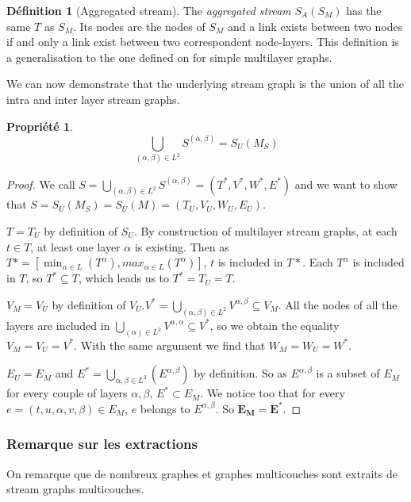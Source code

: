 \documentclass[11pt,a4paper]{article}
\newtheorem{prop}{Propriété}
\theoremstyle{definition}
\newtheorem{defn}{Définition}
\theoremstyle{remark}
\theoremstyle{remark}
\begin{document}
	\begin{defn}[Aggregated stream]
		
		The {\em aggregated stream} $S_A(S_M)$ has the same $T$ as $S_M$. Its nodes are the nodes of $S_M$ and a link exists between two nodes if and only a link exist between two correspondent node-layers.	This definition is a generalisation to the one defined on \cite{mldd} for simple multilayer graphs.
	
	\end{defn}
	
	We can now demonstrate that the underlying stream graph is the union of all the intra and inter layer stream graphs.
	
	\begin{prop}
		\[
			\bigcup_{(\alpha,\beta) \in L^2} S^{(\alpha,\beta)} = S_U(M_S)
		\]
	\end{prop}
	\begin{proof}
	We call $S=\bigcup_{(\alpha,\beta) \in L^2} S^{(\alpha,\beta)}=(T^{*},V^{*},W^{*},E^{*})$ and we want to show that $S=S_U(M_S)=S_U(M) = (T_U,V_U,W_U,E_U)$.
	
	$T=T_U$ by definition of $S_U$. By construction of multilayer stream graphs, at each $t\in T$, at least one layer $\alpha$ is existing. Then as $T* = [\min_{\alpha \in L} (T^{\alpha}),max_{\alpha \in L} (T^{\alpha})]$, $t$ is included in $T*$. Each $T^{\alpha}$ is included in $T$, so $T^* \subseteq T$, which leads us to $T^*=T_U=T$.
	
	$V_M = V_U$ by definition of $V_U$.$V^{*}=\bigcup_{(\alpha,\beta) \in L^2} V^{\alpha,\beta} \subseteq V_M$. All the nodes of all the layers are included in $\bigcup_{(\alpha) \in L^2} V^{\alpha,\alpha} \subseteq V^{*}$, so we obtain the equality $V_M=V_U=V^*$.
	With the same argument we find that $W_M=W_U=W^*$.
	
	$E_U=E_M$ and $E^{*}=\bigcup_{\alpha,\beta \in L^2}(E^{\alpha,\beta})$ by definition. So as $E^{\alpha,\beta}$ is a subset of $E_M$ for every couple of layers $\alpha,\beta$, $E^{*} \subset E_M$. We notice too that for every $e =(t,u,\alpha,v,\beta) \in E_M$, $e$ belongs to $E^{\alpha,\beta}$. So $\mathbf{E_M=E^{*}}$.
					
	\end{proof}

\subsubsection{Remarque sur les extractions}
On remarque que de nombreux graphes et graphes multicouches sont extraits de stream graphs multicouches.
\end{document}
